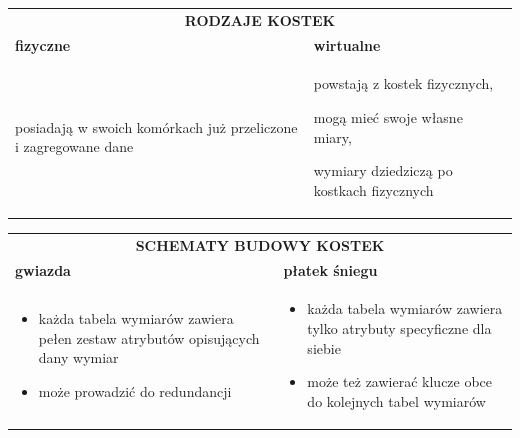 \documentclass[a4paper]{article}
\begin{document}
    \begin{table}[H]
        \begin{center}
            \begin{tabular}{p{8cm} p{8cm}}
                \multicolumn{2}{c}{\textbf{RODZAJE KOSTEK}} \\
                \textbf{fizyczne} & \textbf{wirtualne} \\
                posiadają w swoich komórkach już przeliczone i zagregowane dane
                &
                powstają z kostek fizycznych,

                mogą mieć swoje własne miary,

                wymiary dziedziczą po kostkach fizycznych
            \end{tabular}
        \end{center}
    \end{table}

    \begin{table}[H]
        \begin{center}
            \begin{tabular}{p{8cm} p{8cm}}
                \multicolumn{2}{c}{\textbf{SCHEMATY BUDOWY KOSTEK}} \\
                \textbf{gwiazda} & \textbf{płatek śniegu} \\
                \begin{itemize}[noitemsep]
                    \item każda tabela wymiarów zawiera pełen zestaw atrybutów opisujących dany wymiar
                    \item może prowadzić do redundancji
                \end{itemize}
                &
                \begin{itemize}[noitemsep]
                    \item każda tabela wymiarów zawiera tylko atrybuty specyficzne dla siebie
                    \item może też zawierać klucze obce do kolejnych tabel wymiarów
                \end{itemize}
            \end{tabular}
        \end{center}
    \end{table}
\end{document}
